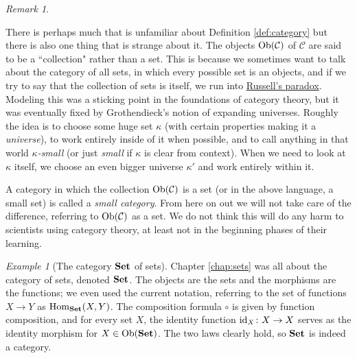 \documentclass{book}
\def\tn{\textnormal}
\def\mc{\mathcal}
\def\Hom{\tn{Hom}}
\def\Ob{\tn{Ob}}
\def\to{\rightarrow}
\def\taking{\colon}
\def\id{\tn{id}}
\def\Set{{\bf Set}}
\def\mcC{\mc{C}}
\theoremstyle{remark}
\newtheorem{remark}[subsubsection]{Remark}
\newtheorem{example}[subsubsection]{Example}
\theoremstyle{definition}
\begin{document}
\begin{remark}\label{rmk:small}

There is perhaps much that is unfamiliar about Definition \ref{def:category} but there is also one thing that is strange about it. The objects $\Ob(\mcC)$ of $\mcC$ are said to be a ``collection" rather than a set. This is because we sometimes want to talk about the category of all sets, in which every possible set is an objects, and if we try to say that the collection of sets is itself, we run into \href{http://en.wikipedia.org/wiki/Russell's_paradox}{\text Russell's paradox}. Modeling this was a sticking point in the foundations of category theory, but it was eventually fixed by Grothendieck's notion of expanding universes. Roughly the idea is to choose some huge set $\kappa$ (with certain properties making it a {\em universe}), to work entirely inside of it when possible, and to call anything in that world {\em $\kappa$-small} (or just {\em small} if $\kappa$ is clear from context). When we need to look at $\kappa$ itself, we  choose an even bigger universe $\kappa'$ and work entirely within it.

A category in which the collection $\Ob(\mcC)$ is a set (or in the above language, a small set) is called a {\em small category}. From here on out we will not take care of the difference, referring to $\Ob(\mcC)$ as a set. We do not think this will do any harm to scientists using category theory, at least not in the beginning phases of their learning.

\end{remark}

\begin{example}[The category $\Set$ of sets]\index{a category!$\Set$}

Chapter \ref{chap:sets} was all about the category of sets, denoted $\Set$. The objects are the sets and the morphisms are the functions; we even used the current notation, referring to the set of functions $X\to Y$ as $\Hom_\Set(X,Y)$. The composition formula $\circ$ is given by function composition, and for every set $X$, the identity function $\id_X\taking X\to X$ serves as the identity morphism for $X\in\Ob(\Set)$. The two laws clearly hold, so $\Set$ is indeed a category. 

\end{example}
\end{document}
